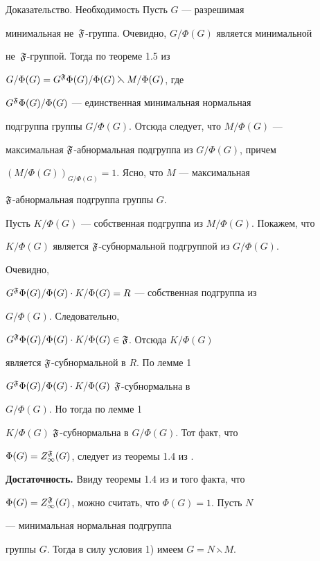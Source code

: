 \begin{pf*}{Доказательство. Необходимость} Пусть $G$ --- разрешимая


минимальная не~$\frak F$-группа. Очевидно, $G/\Phi(G)$ является минимальной


не~$\frak F$-группой. Тогда по теореме 1.5 из \cite{S3}


$G/\Phi(G)=G^{\frak F}\Phi(G)/\Phi(G)\leftthreetimes M/\Phi(G)$, где


$G^{\frak F}\Phi(G)/\Phi(G)$ --- единственная минимальная нормальная


подгруппа группы $G/\Phi(G)$. Отсюда следует, что $M/\Phi(G)$ ---


максимальная $\frak F$-абнормальная подгруппа из $G/\Phi(G)$, причем


$(M/\Phi(G))_{G/\Phi(G)}=1$. Ясно, что $M$ --- максимальная


$\frak F$-абнормальная подгруппа группы $G$.





Пусть $K/\Phi(G)$ --- собственная подгруппа из $M/\Phi(G)$. Покажем, что


$K/\Phi(G)$ является $\frak F$-субнормальной подгруппой из $G/\Phi(G)$.


Очевидно,


$G^{\frak F}\Phi(G)/\Phi(G)\cdot K/\Phi(G)=R$ --- собственная подгруппа из


$G/\Phi(G)$. Следовательно,


$G^{\frak F}\Phi(G)/\Phi(G)\cdot K/\Phi(G)\in\frak F$. Отсюда $K/\Phi(G)$


является $\frak F$-субнормальной в $R$. По лемме 1\;


$G^{\frak F}\Phi(G)/\Phi(G)\cdot K/\Phi(G)$\; $\frak F$-субнормальна в


$G/\Phi(G)$. Но тогда по лемме 1\;


$K/\Phi(G)$\; $\frak F$-субнормальна в $G/\Phi(G)$. Тот факт, что


$\Phi(G)=Z^{\frak F}_\infty(G)$, следует из теоремы 1.4 из \cite{S3}.


\medskip





{\bf Достаточность.} Ввиду теоремы 1.4 из \cite{S3} и того факта, что


$\Phi(G)=Z^{\frak F}_\infty(G)$, можно считать, что $\Phi(G)=1$. Пусть $N$


--- минимальная нормальная подгруппа


группы $G$. Тогда в силу условия 1) имеем $G=N\leftthreetimes M$.



\end{pf*}
